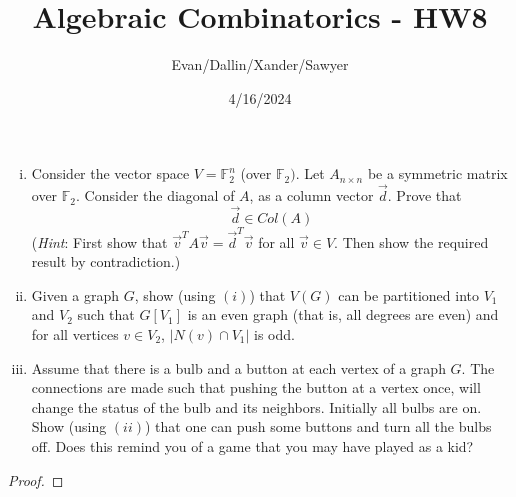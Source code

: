 \documentclass[11pt,letterpaper]{article}
\title{Algebraic Combinatorics - HW8}
\author{Evan/Dallin/Xander/Sawyer}
\date{4/16/2024}
\begin{document}
\maketitle
\begin{quest}[\textcolor{red}{Saving electricity through Linear Algebra and Graph Theory}]
    \begin{enumerate}[(i)]
        \item Consider the vector space $V=\mathbb{F}_2^n$ (over $\mathbb{F}_2)$. Let $A_{n\times n}$ be a symmetric matrix over $\mathbb{F}_2$. Consider the diagonal of $A$, as a column vector $\overrightarrow{d}$. Prove that 
        \[\vec{d}\in Col(A)\]
        (\textit{Hint}: First show that $\vec{v}^{T}A\vec{v}=\vec{d}^{T}\vec{v}$ for all $\vec{v}\in V$. Then show the required result by contradiction.)
        \item Given a graph $G$, show (using $(i)$) that $V(G)$ can be partitioned into $V_1$ and $V_2$ such that $G[V_1]$ is an even graph (that is, all degrees are even) and for all vertices $v\in V_2$, $|N(v)\cap V_1|$ is odd.
        \item Assume that there is a bulb and a button at each vertex of a graph $G$. The connections are made such that pushing the button at a vertex once, will change the status of the bulb and its neighbors. Initially all bulbs are on. Show (using $(ii)$) that one can push some buttons and turn all the bulbs off. Does this remind you of a game that you may have played as a kid?
    \end{enumerate}
\end{quest}
\begin{proof}
    
\end{proof}
\end{document}
